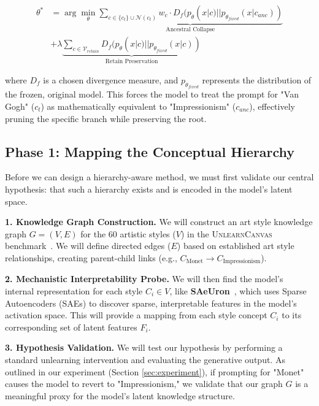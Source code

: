 \begin{equation}
\label{eq:objective}
\begin{aligned}
\theta^* &= \arg\min_{\theta} \underbrace{\sum_{c \in \{c_t\} \cup \mathcal{N}(c_t)} w_{c} \cdot D_f(p_\theta(x|c) || p_{\theta_{fixed}}(x|c_{anc}))}_{\text{Ancestral Collapse}} \\
&+ \lambda \underbrace{\sum_{c \in \mathcal{V}_{retain}} D_f(p_\theta(x|c) || p_{\theta_{fixed}}(x|c))}_{\text{Retain Preservation}}
\end{aligned}
\end{equation}

where $D_f$ is a chosen divergence measure, and $p_{\theta_{fixed}}$ represents the distribution of the frozen, original model. This forces the model to treat the prompt for "Van Gogh" ($c_t$) as mathematically equivalent to "Impressionism" ($c_{anc}$), effectively pruning the specific branch while preserving the root.


\subsection{Phase 1: Mapping the Conceptual Hierarchy}
Before we can design a hierarchy-aware method, we must first validate our central hypothesis: that such a hierarchy exists and is encoded in the model's latent space.

\noindent \textbf{1. Knowledge Graph Construction.}
We will construct an art style knowledge graph $G = (V, E)$ for the 60 artistic styles ($V$) in the \textsc{UnlearnCanvas} benchmark~\cite{zhang2024unlearncanvas}. We will define directed edges ($E$) based on established art style relationships, creating parent-child links (e.g., $C_{\text{Monet}} \rightarrow C_{\text{Impressionism}}$).

\noindent \textbf{2. Mechanistic Interpretability Probe.}
We will then find the model's internal representation for each style $C_i \in V$, like \textbf{SAeUron}~\cite{cywinski2025saeuron}, which uses Sparse Autoencoders (SAEs) to discover sparse, interpretable features in the model's activation space. This will provide a mapping from each style concept $C_i$ to its corresponding set of latent features $F_i$.

\noindent \textbf{3. Hypothesis Validation.}
We will test our hypothesis by performing a standard unlearning intervention and evaluating the generative output. As outlined in our experiment (Section \ref{sec:experiment}), if prompting for "Monet" causes the model to revert to "Impressionism," we validate that our graph $G$ is a meaningful proxy for the model's latent knowledge structure.



